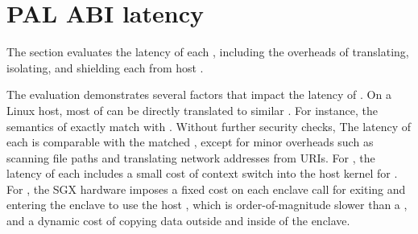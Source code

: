 \section{PAL ABI latency}

The section evaluates the latency of each \hostapi{}, including
the overheads of translating, isolating, and shielding each \hostapi{} from host \linuxapis{}.



The evaluation demonstrates several factors that impact the latency of \hostapis{}.
On a Linux host, most of \thehostabi{} can be directly translated to similar \linuxapis{}. For instance, the semantics of  exactly match with .
Without further security checks,
The latency of each \hostapi{} is comparable with the matched \linuxapi{},
except for minor overheads such as scanning file paths and translating network addresses from URIs.
For \graphene{}, the latency of each \hostapi{} includes
a small cost of context switch into the host kernel for \linuxapis{}.
For \graphenesgx{}, the SGX hardware imposes a fixed cost on each enclave call
for exiting and entering the enclave to use the host \linuxapis{},
which is order-of-magnitude slower than a \linuxapi{},
and a dynamic cost of copying data outside and inside of the enclave. 

